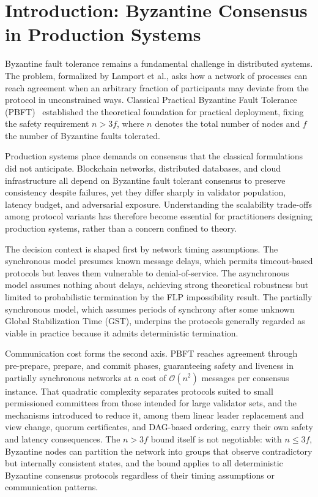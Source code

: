 \section{Introduction: Byzantine Consensus in Production Systems}

Byzantine fault tolerance remains a fundamental challenge in distributed systems. The problem, formalized by Lamport et al., asks how a network of processes can reach agreement when an arbitrary fraction of participants may deviate from the protocol in unconstrained ways. Classical Practical Byzantine Fault Tolerance (PBFT)~\cite{castro1999practical} established the theoretical foundation for practical deployment, fixing the safety requirement $n > 3f$, where $n$ denotes the total number of nodes and $f$ the number of Byzantine faults tolerated.

Production systems place demands on consensus that the classical formulations did not anticipate. Blockchain networks, distributed databases, and cloud infrastructure all depend on Byzantine fault tolerant consensus to preserve consistency despite failures, yet they differ sharply in validator population, latency budget, and adversarial exposure. Understanding the scalability trade-offs among protocol variants has therefore become essential for practitioners designing production systems, rather than a concern confined to theory.

The decision context is shaped first by network timing assumptions. The synchronous model presumes known message delays, which permits timeout-based protocols but leaves them vulnerable to denial-of-service. The asynchronous model assumes nothing about delays, achieving strong theoretical robustness but limited to probabilistic termination by the FLP impossibility result. The partially synchronous model, which assumes periods of synchrony after some unknown Global Stabilization Time (GST), underpins the protocols generally regarded as viable in practice because it admits deterministic termination.

Communication cost forms the second axis. PBFT reaches agreement through pre-prepare, prepare, and commit phases, guaranteeing safety and liveness in partially synchronous networks at a cost of $\mathcal{O}(n^2)$ messages per consensus instance. That quadratic complexity separates protocols suited to small permissioned committees from those intended for large validator sets, and the mechanisms introduced to reduce it, among them linear leader replacement and view change, quorum certificates, and DAG-based ordering, carry their own safety and latency consequences. The $n > 3f$ bound itself is not negotiable: with $n \leq 3f$, Byzantine nodes can partition the network into groups that observe contradictory but internally consistent states, and the bound applies to all deterministic Byzantine consensus protocols regardless of their timing assumptions or communication patterns.

